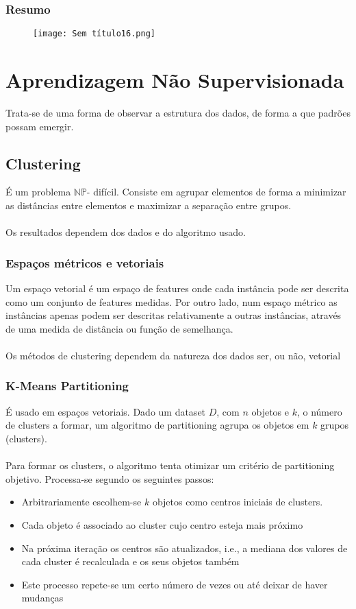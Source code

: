\documentclass[10pt,a4paper]{report}
\begin{document}
\subsubsection{Resumo}
\begin{figure}[H]
\centering
\texttt{[image: Sem título16.png]}
\end{figure}
\section{Aprendizagem Não Supervisionada}
Trata-se de uma forma de observar a estrutura dos dados, de forma a que padrões possam emergir.
\subsection{Clustering}
É um problema $\mathbb{N}\mathbb{P}$- difícil. Consiste em agrupar elementos de forma a minimizar as distâncias entre elementos e maximizar a separação entre grupos.\\
\\
Os resultados dependem dos dados e do algoritmo usado.
\subsubsection{Espaços métricos e vetoriais}
Um espaço vetorial é um espaço de features onde cada instância pode ser descrita como um conjunto de features medidas. Por outro lado, num espaço métrico as instâncias apenas podem ser descritas relativamente a outras instâncias, através de uma medida de distância ou função de semelhança.\\
\\
Os métodos de clustering dependem da natureza dos dados ser, ou não, vetorial
\subsubsection{K-Means Partitioning}
É usado em espaços vetoriais. Dado um dataset $D$, com $n$ objetos e $k$, o número de clusters a formar, um algoritmo de partitioning agrupa os objetos em $k$ grupos (clusters).\\
\\
Para formar os clusters, o algoritmo tenta otimizar um critério de partitioning objetivo. Processa-se segundo os seguintes passos:
\begin{itemize}
\item Arbitrariamente escolhem-se $k$ objetos como centros iniciais de clusters.
\item Cada objeto é associado ao cluster cujo centro esteja mais próximo
\item Na próxima iteração os centros são atualizados, i.e., a mediana dos valores de cada cluster é recalculada e os seus objetos também
\item Este processo repete-se um certo número de vezes ou até deixar de haver mudanças
\end{itemize}
\end{document}

